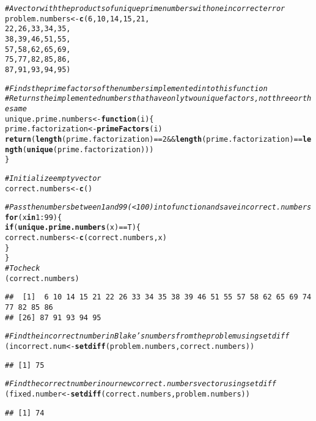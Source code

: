 \documentclass{article}\usepackage[]{graphicx}\usepackage[]{xcolor}
\makeatletter
\newcommand{\hlnum}[1]{\textcolor[rgb]{0.686,0.059,0.569}{#1}}%
\newcommand{\hlcom}[1]{\textcolor[rgb]{0.678,0.584,0.686}{\textit{#1}}}%
\newcommand{\hlopt}[1]{\textcolor[rgb]{0,0,0}{#1}}%
\newcommand{\hldef}[1]{\textcolor[rgb]{0.345,0.345,0.345}{#1}}%
\newcommand{\hlkwa}[1]{\textcolor[rgb]{0.161,0.373,0.58}{\textbf{#1}}}%
\newcommand{\hlkwb}[1]{\textcolor[rgb]{0.69,0.353,0.396}{#1}}%
\newcommand{\hlkwc}[1]{\textcolor[rgb]{0.333,0.667,0.333}{#1}}%
\newcommand{\hlkwd}[1]{\textcolor[rgb]{0.737,0.353,0.396}{\textbf{#1}}}%
\newenvironment{kframe}{%
 \def\at@end@of@kframe{}%
 \ifinner\ifhmode%
  \def\at@end@of@kframe{\end{minipage}}%
  \begin{minipage}{\columnwidth}%
 \fi\fi%
 \def\FrameCommand##1{\hskip\@totalleftmargin \hskip-\fboxsep
 \colorbox{shadecolor}{##1}\hskip-\fboxsep
     \hskip-\linewidth \hskip-\@totalleftmargin \hskip\columnwidth}%
 \MakeFramed {\advance\hsize-\width
   \@totalleftmargin\z@ \linewidth\hsize
   \@setminipage}}%
 {\par\unskip\endMakeFramed%
 \at@end@of@kframe}
\newenvironment{knitrout}{}{} %
\makeatother
\begin{document}
\begin{enumerate}
\begin{knitrout}
\begin{kframe}
\begin{alltt}
\hlcom{# A vector with the products of unique prime numbers with one incorrect error}
\hldef{problem.numbers} \hlkwb{<-} \hlkwd{c}\hldef{(}\hlnum{6}\hldef{,} \hlnum{10}\hldef{,} \hlnum{14}\hldef{,} \hlnum{15}\hldef{,} \hlnum{21}\hldef{,}
                    \hlnum{22}\hldef{,} \hlnum{26}\hldef{,} \hlnum{33}\hldef{,} \hlnum{34}\hldef{,} \hlnum{35}\hldef{,}
                    \hlnum{38}\hldef{,} \hlnum{39}\hldef{,} \hlnum{46}\hldef{,} \hlnum{51}\hldef{,} \hlnum{55}\hldef{,}
                    \hlnum{57}\hldef{,} \hlnum{58}\hldef{,} \hlnum{62}\hldef{,} \hlnum{65}\hldef{,} \hlnum{69}\hldef{,}
                    \hlnum{75}\hldef{,} \hlnum{77}\hldef{,} \hlnum{82}\hldef{,} \hlnum{85}\hldef{,} \hlnum{86}\hldef{,}
                    \hlnum{87}\hldef{,} \hlnum{91}\hldef{,} \hlnum{93}\hldef{,} \hlnum{94}\hldef{,} \hlnum{95}\hldef{)}

\hlcom{# Finds the prime factors of the numbers implemented into this function }
\hlcom{# Returns the implemented numbers that have only two unique factors, not three or the same}
\hldef{unique.prime.numbers} \hlkwb{<-} \hlkwa{function}\hldef{(}\hlkwc{i}\hldef{)\{}
  \hldef{prime.factorization} \hlkwb{<-} \hlkwd{primeFactors}\hldef{(i)}
  \hlkwd{return} \hldef{(}\hlkwd{length}\hldef{(prime.factorization)} \hlopt{==} \hlnum{2} \hlopt{&&} \hlkwd{length}\hldef{(prime.factorization)} \hlopt{==} \hlkwd{length}\hldef{(}\hlkwd{unique}\hldef{(prime.factorization)))}
\hldef{\}}

\hlcom{# Initialize empty vector}
\hldef{correct.numbers} \hlkwb{<-} \hlkwd{c}\hldef{()}

\hlcom{# Pass the numbers between 1 and 99 (<100) into function and save in correct.numbers}
\hlkwa{for} \hldef{(x} \hlkwa{in} \hlnum{1}\hlopt{:}\hlnum{99}\hldef{)\{}
  \hlkwa{if}\hldef{(}\hlkwd{unique.prime.numbers}\hldef{(x)} \hlopt{==} \hldef{T)\{}
    \hldef{correct.numbers} \hlkwb{<-} \hlkwd{c}\hldef{(correct.numbers, x)}
  \hldef{\}}
\hldef{\}}
\hlcom{# To check }
\hldef{(correct.numbers)}
\end{alltt}
\begin{verbatim}
##  [1]  6 10 14 15 21 22 26 33 34 35 38 39 46 51 55 57 58 62 65 69 74 77 82 85 86
## [26] 87 91 93 94 95
\end{verbatim}
\begin{alltt}
\hlcom{# Find the incorrect number in Blake's numbers from the problem using setdiff}
\hldef{(incorrect.num} \hlkwb{<-} \hlkwd{setdiff}\hldef{(problem.numbers, correct.numbers))}
\end{alltt}
\begin{verbatim}
## [1] 75
\end{verbatim}
\begin{alltt}
\hlcom{# Find the correct number in our new correct.numbers vector using setdiff}
\hldef{(fixed.number} \hlkwb{<-} \hlkwd{setdiff}\hldef{(correct.numbers, problem.numbers))}
\end{alltt}
\begin{verbatim}
## [1] 74
\end{verbatim}
\end{kframe}
\end{knitrout}
\end{enumerate}
\end{document}
